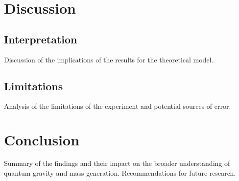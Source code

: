 \documentclass{article}
\begin{document}
\section{Discussion}
\subsection{Interpretation}
Discussion of the implications of the results for the theoretical model.
\subsection{Limitations}
Analysis of the limitations of the experiment and potential sources of error.

\section{Conclusion}
Summary of the findings and their impact on the broader understanding of quantum gravity and mass generation. Recommendations for future research.
\end{document}
